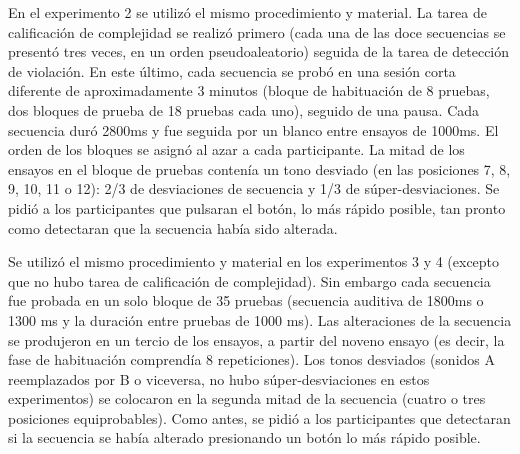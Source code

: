 En el experimento 2 se utilizó el mismo procedimiento y material. La tarea de calificación de complejidad se realizó primero (cada una de las doce secuencias se presentó tres veces, en un orden pseudoaleatorio) seguida de la tarea de detección de violación. En este último, cada secuencia se probó en una sesión corta diferente de aproximadamente 3 minutos (bloque de habituación de 8 pruebas, dos bloques de prueba de 18 pruebas cada uno), seguido de una pausa. Cada secuencia duró 2800ms y fue seguida por un blanco entre ensayos de 1000ms. El orden de los bloques se asignó al azar a cada participante. La mitad de los ensayos en el bloque de pruebas contenía un tono desviado (en las posiciones 7, 8, 9, 10, 11 o 12): 2/3 de desviaciones de secuencia y 1/3 de súper-desviaciones. Se pidió a los participantes que pulsaran el botón, lo más rápido posible, tan pronto como detectaran que la secuencia había sido alterada.


Se utilizó el mismo procedimiento y material en los experimentos 3 y 4 (excepto que no hubo tarea de calificación de complejidad). Sin embargo cada secuencia fue probada en un solo bloque de 35 pruebas (secuencia auditiva de 1800ms o 1300 ms y la duración entre pruebas de 1000 ms). Las alteraciones de la secuencia se produjeron en un tercio de los ensayos, a partir del noveno ensayo (es decir, la fase de habituación comprendía 8 repeticiones). Los tonos desviados (sonidos A reemplazados por B o viceversa, no hubo súper-desviaciones en estos experimentos) se colocaron en la segunda mitad de la secuencia (cuatro o tres posiciones equiprobables). Como antes, se pidió a los participantes que detectaran si la secuencia se había alterado presionando un botón lo más rápido posible.

